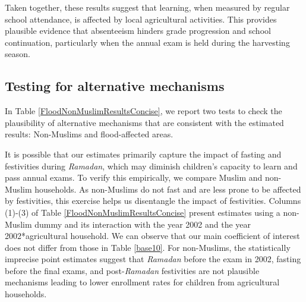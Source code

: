 \documentclass[12pt,letterpaper]{article}
\newcommand{\0}{\ensuremath{\mbox{\boldmath $0$}}}
\begin{document}
Taken together, these results suggest that learning, when measured by regular school attendance, is affected by local agricultural activities. This provides plausible evidence that absenteeism hinders grade progression and school continuation, particularly when the annual exam is held during the harvesting season.

\subsection{Testing for alternative mechanisms}

In Table \ref{FloodNonMuslimResultsConcise}, we report two tests to check the plausibility of alternative mechanisms that are consistent with the estimated results: Non-Muslims and flood-affected areas. 

It is possible that our estimates primarily capture the impact of fasting and festivities during \textit{Ramadan}, which may diminish children's capacity to learn and pass annual exams. To verify this empirically, we compare Muslim and non-Muslim households. As non-Muslims do not fast and are less prone to be affected by festivities, this exercise helps us disentangle the impact of festivities. Columns (1)-(3) of Table \ref{FloodNonMuslimResultsConcise} present estimates using a non-Muslim dummy and its interaction with the year 2002 and the year 2002*agricultural household. We can observe that our main coefficient of interest does not differ from those in Table \ref{base10}. For non-Muslims, the statistically imprecise point estimates suggest that \textit{Ramadan} before the exam in 2002, fasting before the final exams, and post-\textit{Ramadan} festivities are not plausible mechanisms leading to lower enrollment rates for children from agricultural households.
\end{document}
